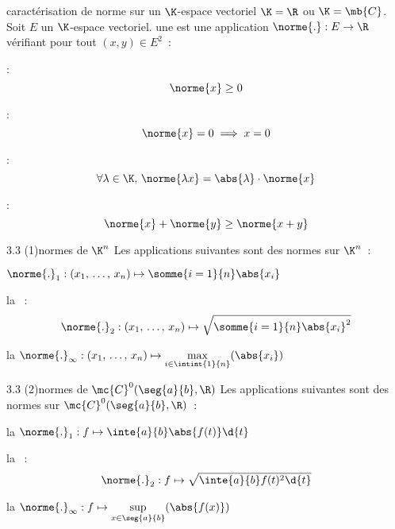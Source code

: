 

\begin{adjustwidth}{-3cm}{-3cm}


\begin{definition}{3.1}{caractérisation de norme sur un $\K$-espace vectoriel}
    $\K = \R$ ou $\K = \mb{C}$.\\
    Soit $E$ un $\K$-espace vectoriel. une  est une application $\norme{.} : E \to \R$ vérifiant pour tout $(x,y) \in E^2$~:  
    \begin{enumeratebf}
        \item {} :
            $$\norme{x} \geq 0$$
        \item {} : 
            $$\norme{x} = 0 \implies x = 0$$
        \item {} : 
            $$\forall \lambda \in \K,\, \norme{\lambda x} = \abs{\lambda} \cdot \norme{x}$$
        \item {} :
            $$\norme{x} + \norme{y} \geq \norme{x + y}$$
    \end{enumeratebf}
    
\end{definition}

\begin{exemple}{3.3 (1)}{normes de $\K^n$}
    Les applications suivantes sont des normes sur $\K^n$~:
    \begin{enumeratebf}
        \item $\displaystyle \norme{.}_1 : (x_1,\, \dots,\, x_n) \mapsto \somme{i=1}{n}\abs{x_i}$
        \item la ~:
        $$\norme{.}_2 : (x_1,\, \dots,\, x_n) \mapsto \sqrt{\somme{i=1}{n} \abs{x_i}^2}$$
        \item la  $\displaystyle \norme{.}_\infty : (x_1,\, \dots,\, x_n) \mapsto \max_{i \in \intint{1}{n}}(\abs{x_i})$
    \end{enumeratebf}
\end{exemple}

\begin{exemple}{3.3 (2)}{normes de $\mc{C}^0(\seg{a}{b}, \R)$}
    Les applications suivantes sont des normes sur $\mc{C}^0(\seg{a}{b}, \R)$~:
    \begin{enumeratebf}
        \item la  $\displaystyle \norme{.}_1 : f \mapsto \inte{a}{b}\abs{f(t)}\d{t}$
        \item la ~: 
        $$\norme{.}_2 : f \mapsto \sqrt{\inte{a}{b}f(t)^2\d{t}}$$
        \item la  $\displaystyle \norme{.}_\infty : f \mapsto \sup_{x \in \seg{a}{b}}(\abs{f(x)})$
    \end{enumeratebf}
\end{exemple}


\end{adjustwidth}

